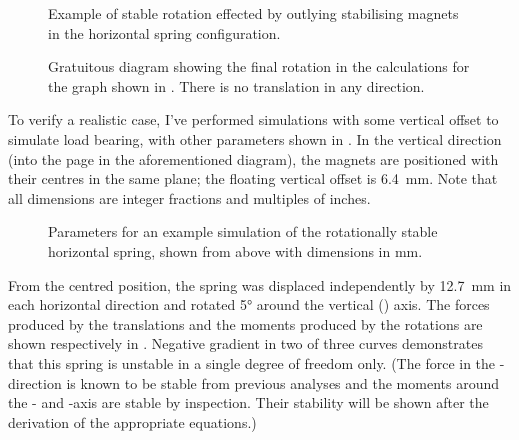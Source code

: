 \begin{figure}
  \caption{Example of stable rotation effected by outlying
     stabilising magnets in the horizontal spring configuration.}
\end{figure}

\begin{figure}
  \caption{Gratuitous diagram showing the final rotation in the calculations
     for the graph shown in .
     There is no translation in any direction.}
\end{figure}


To verify a realistic case, I've performed simulations with some
vertical offset to simulate load bearing, with other parameters
shown in . In the vertical
direction (into the page in the aforementioned diagram), the magnets
are positioned with their centres in the same plane; the floating
vertical offset is \SI{6.4}{mm}. Note that all dimensions are
integer fractions and multiples of inches.

\begin{figure}
  \caption{Parameters for an example simulation of the rotationally stable horizontal spring, shown from above with dimensions in mm.}
\end{figure}

From the centred position, the spring was displaced independently by
\SI{12.7}{mm} in each horizontal direction and rotated 5° around
the vertical (\x) axis. The forces produced by the translations and
the moments produced by the rotations are shown respectively in
.
Negative gradient in two of three curves demonstrates that this
spring is unstable in a single degree of freedom only. (The force in
the \x-direction is known to be stable from previous analyses and
the moments around the \y- and \z-axis are stable by inspection.
Their stability will be shown after the derivation of the
appropriate equations.)

